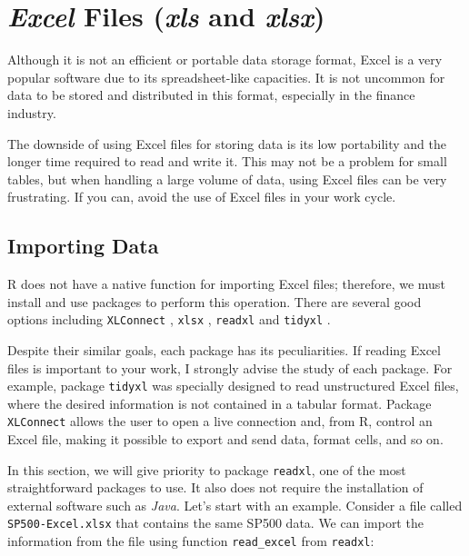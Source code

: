 \documentclass[
  12pt,
]{book}
\begin{document}
\hypertarget{excel-files-xls-and-xlsx}{%
\section{\texorpdfstring{\emph{Excel} Files (\emph{xls} and \emph{xlsx})}{Excel Files (xls and xlsx)}}\label{excel-files-xls-and-xlsx}}

Although it is not an efficient or portable data storage format, Excel is a very popular software due to its spreadsheet-like capacities. It is not uncommon for data to be stored and distributed in this format, especially in the finance industry.

The downside of using Excel files for storing data is its low portability and the longer time required to read and write it. This may not be a problem for small tables, but when handling a large volume of data, using Excel files can be very frustrating. If you can, avoid the use of Excel files in your work cycle.

\hypertarget{importing-data-1}{%
\subsection{Importing Data}\label{importing-data-1}}

R does not have a native function for importing Excel files; therefore, we must install and use packages to perform this operation. There are several good options including \texttt{XLConnect} \citep{R-XLConnect}, \texttt{xlsx} \citep{R-xlsx}, \texttt{readxl} \citep{R-readxl} and \texttt{tidyxl} \citep{R-tidyxl}.   

Despite their similar goals, each package has its peculiarities. If reading Excel files is important to your work, I strongly advise the study of each package. For example, package \texttt{tidyxl} was specially designed to read unstructured Excel files, where the desired information is not contained in a tabular format. Package \texttt{XLConnect} allows the user to open a live connection and, from R, control an Excel file, making it possible to export and send data, format cells, and so on.

In this section, we will give priority to package \texttt{readxl}, one of the most straightforward packages to use. It also does not require the installation of external software such as \emph{Java}. Let's start with an example. Consider a file called \texttt{SP500-Excel.xlsx} that contains the same SP500 data. We can import the information from the file using function \texttt{read\_excel} from \texttt{readxl}: 
\end{document}
